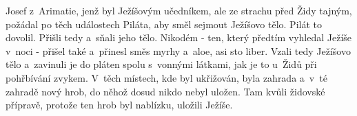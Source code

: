 Josef z~Arimatie, jenž byl Ježíšovým učedníkem, ale ze strachu před Židy
tajným, požádal po těch událostech Piláta, aby směl sejmout Ježíšovo tělo.
Pilát to dovolil. Přišli tedy a~sňali jeho tělo. Nikodém - ten, který
předtím vyhledal Ježíše v~noci - přišel také a~přinesl směs myrhy a~aloe,
asi sto liber. Vzali tedy Ježíšovo tělo a~zavinuli je do pláten spolu
s~vonnými látkami, jak je to u~Židů při pohřbívání zvykem. V~těch místech, kde
byl ukřižován, byla zahrada a~v~té zahradě nový hrob, do něhož dosud nikdo
nebyl uložen. Tam kvůli židovské přípravě, protože ten hrob byl nablízku,
uložili Ježíše.
